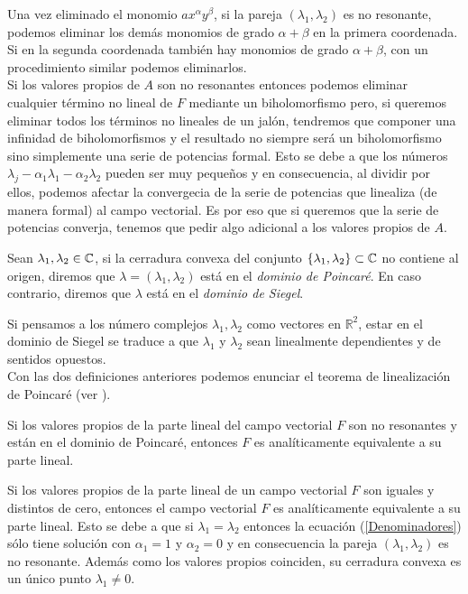 Una vez eliminado el monomio $ax^{\alpha}y^{\beta}$, si la pareja $(\lambda_{1},\lambda_{2})$ es no resonante, podemos eliminar los demás monomios de grado $\alpha+\beta$ en la primera coordenada. Si en la segunda coordenada también hay monomios de grado $\alpha+\beta$, con un procedimiento similar podemos eliminarlos. \\ 
Si los valores propios de $A$ son no resonantes entonces podemos eliminar cualquier término no lineal de $F$ mediante un biholomorfismo pero, si queremos eliminar todos los términos no lineales de un jalón, tendremos que componer una infinidad de biholomorfismos y el resultado no siempre será un biholomorfismo sino simplemente una serie de potencias formal. Esto se debe a que los números $\lambda_{j}-\alpha_{1}\lambda_{1}-\alpha_{2}\lambda_{2}$ pueden ser muy pequeños y en consecuencia, al dividir por ellos, podemos afectar la convergecia de la serie de potencias que linealiza (de manera formal) al campo vectorial. Es por eso que si queremos que la serie de potencias converja, tenemos que pedir algo adicional a los valores propios de $A$.

\begin{defn}
\label{Def:DominioPoincare}
Sean $\lambda_{1},\lambda_{2}\in\mathbb{C}$, si la cerradura convexa del conjunto $\{ \lambda_{1},\lambda_{2}\}\subset\mathbb{C}$ no contiene al origen, diremos que $\lambda=(\lambda_{1},\lambda_{2})$ está en el \emph{dominio de Poincaré}. En caso contrario, diremos que $\lambda$ está en el \emph{dominio de Siegel}.
\end{defn}

Si pensamos a los número complejos $\lambda_{1},\lambda_{2}$ como vectores en $\mathbb{R}^{2}$, estar en el dominio de Siegel se traduce a que $\lambda_{1}$ y $\lambda_{2}$ sean linealmente dependientes y de sentidos opuestos.\\

Con las dos definiciones anteriores podemos enunciar el teorema de linealización de Poincaré (ver \cite{IlyaYako}).
\begin{Teorema}
Si los valores propios de la parte lineal del campo vectorial $F$ son no resonantes y están en el dominio de Poincaré, entonces $F$ es analíticamente equivalente a su parte lineal.
\end{Teorema}

\begin{Ejemplo}
\label{Ej:LinealizacionRadial}
Si los valores propios de la parte lineal de un campo vectorial $F$ son iguales y distintos de cero, entonces el campo vectorial $F$ es analíticamente equivalente a su parte lineal. Esto se debe a que si $\lambda_{1}=\lambda_{2}$ entonces la ecuación (\ref{Denominadores}) sólo tiene solución con $\alpha_{1}=1$ y $\alpha_{2}=0$ y en consecuencia la pareja $(\lambda_{1},\lambda_{2})$ es no resonante. Además como los valores propios coinciden, su cerradura convexa es un único punto $\lambda_{1}\neq 0$. 
\end{Ejemplo}

